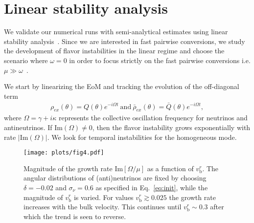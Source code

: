 \documentclass[aps, prd, 10pt, twocolumn, superscriptaddress, noshowpacs, preprintnumbers, longbibliography, groupedaddress, footinbib, bibnotes]{revtex4-1}
\newcommand{\vbr}{v_{\mathrm{b}}^{r}}
\begin{document}
\section{Linear stability analysis}
\label{linearstability}

We validate our numerical runs with semi-analytical estimates using linear stability analysis~\cite{Banerjee:2011fj, Raffelt:2013rqa, Abbar:2015mca, Duan:2014gfa, Sawyer:2008zs}. Since we are interested in fast pairwise conversions, we study the development of flavor instabilities in the linear regime and choose the scenario where $\omega=0$ in order to focus strictly on the fast pairwise conversions i.e. $\mu \gg \omega$~\cite{Izaguirre:2016gsx}.

We start by linearizing the EoM and tracking the evolution of the off-diagonal term
\begin{eqnarray}\label{eq:ansatz}
 \rho_{ex}(\theta) = Q(\theta)e^{-i\Omega t} \ \mathrm{and}\ 
 \bar{\rho}_{ex}(\theta) = \bar{Q}(\theta)e^{-i\Omega t} ,
\end{eqnarray}
where $\Omega = \gamma + i \kappa$ represents the collective oscillation frequency for neutrinos and antineutrinos. If Im$(\Omega) \neq 0$, then the flavor instability grows exponentially with rate $|$Im$(\Omega)|$. We look for temporal instabilities for the homogeneous mode.

\begin{figure}[t!]
\centering
\texttt{[image: plots/fig4.pdf]}
\caption{
Magnitude of the growth rate $\mathrm{Im}[\Omega/\mu]$ as a function of $\vbr$. The angular distributions of (anti)neutrinos are fixed by choosing  $\delta=-0.02$ and $\sigma_{\nu}=0.6$ as specified in Eq.~\ref{eq:init}, while the magnitude of $\vbr$ is varied. For values $\vbr \gtrsim 0.025$ the growth rate increases with the bulk velocity. This continues until $\vbr \sim 0.3$ after which the trend is seen to reverse.
}
\label{fig:4pr}
\end{figure}
\end{document}
